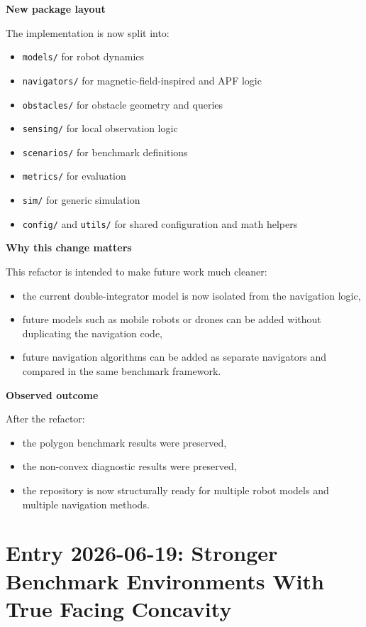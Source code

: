 \documentclass[11pt]{article}
\begin{document}
\textbf{New package layout}

The implementation is now split into:

\begin{itemize}[leftmargin=*]
  \item \texttt{models/} for robot dynamics
  \item \texttt{navigators/} for magnetic-field-inspired and APF logic
  \item \texttt{obstacles/} for obstacle geometry and queries
  \item \texttt{sensing/} for local observation logic
  \item \texttt{scenarios/} for benchmark definitions
  \item \texttt{metrics/} for evaluation
  \item \texttt{sim/} for generic simulation
  \item \texttt{config/} and \texttt{utils/} for shared configuration and math helpers
\end{itemize}

\textbf{Why this change matters}

This refactor is intended to make future work much cleaner:

\begin{itemize}[leftmargin=*]
  \item the current double-integrator model is now isolated from the navigation logic,
  \item future models such as mobile robots or drones can be added without duplicating the navigation code,
  \item future navigation algorithms can be added as separate navigators and compared in the same benchmark framework.
\end{itemize}

\textbf{Observed outcome}

After the refactor:

\begin{itemize}[leftmargin=*]
  \item the polygon benchmark results were preserved,
  \item the non-convex diagnostic results were preserved,
  \item the repository is now structurally ready for multiple robot models and multiple navigation methods.
\end{itemize}

\section*{Entry 2026-06-19: Stronger Benchmark Environments With True Facing Concavity}
\end{document}

